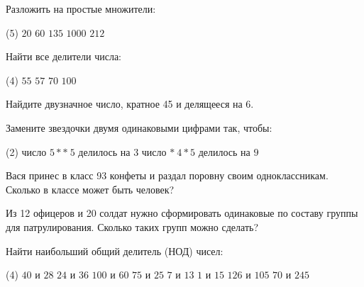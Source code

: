 \begin{class}[number=5]
	\begin{listofex}
	\item Разложить на простые множители:
	\begin{tasks}(5)
		\task \( 20 \)
		\task \( 60 \)
		\task \( 135 \)
		\task \( 1000 \)
		\task \( 212 \)
	\end{tasks}
	\item Найти все делители числа:
	\begin{tasks}(4)
		\task \( 55 \)
		\task \( 57 \)
		\task \( 70 \)
		\task \( 100 \)
	\end{tasks}
	\item Найдите двузначное число, кратное 45 и делящееся на 6.
	\item Замените звездочки двумя одинаковыми цифрами так, чтобы:
	\begin{tasks}(2)
		\task число \( 5**\:5 \) делилось на \( 3 \)
		\task число \( *\:4*5 \) делилось на \( 9 \)
	\end{tasks}
	\item Вася принес в класс 93 конфеты и раздал поровну своим одноклассникам. Сколько в классе может быть человек?
	\item Из 12 офицеров и 20 солдат нужно сформировать одинаковые по составу группы для патрулирования. Сколько таких групп можно сделать?
	\item Найти наибольший общий делитель (НОД) чисел:
	\begin{tasks}(4)
		\task \( 40 \) и \( 28 \)
		\task \( 24 \) и \( 36 \)
		\task \( 100 \) и \( 60 \)
		\task \( 75 \) и \( 25 \)
		\task \( 7 \) и \( 13 \)
		\task \( 1 \) и \( 15 \)
		\task \( 126 \) и \( 105 \)
		\task \( 70 \) и \( 245 \)
	\end{tasks}
	\end{listofex}
\end{class}

